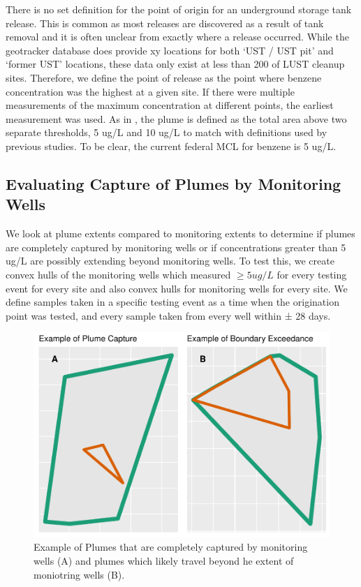 \documentclass[draft,linenumbers]{agujournal2018}
\begin{document}
There is no set definition for the point of origin for an underground
storage tank release. This is common as most releases are discovered as
a result of tank removal and it is often unclear from exactly where a
release occurred. While the geotracker database does provide xy
locations for both `UST / UST pit' and `former UST' locations, these
data only exist at less than 200 of LUST cleanup sites. Therefore, we
define the point of release as the point where benzene concentration was
the highest at a given site. If there were multiple measurements of the
maximum concentration at different points, the earliest measurement was
used. As in \citet{connor2015}, the plume is defined as the total area
above two separate thresholds, 5 ug/L and 10 ug/L to match with
definitions used by previous studies. To be clear, the current federal
MCL for benzene is 5 ug/L.

\subsection{Evaluating Capture of Plumes by Monitoring Wells}

We look at plume extents compared to monitoring extents to determine if
plumes are completely captured by monitoring wells or if concentrations
greater than 5 ug/L are possibly extending beyond monitoring wells. To
test this, we create convex hulls \citep{sf} of the monitoring wells
which measured \(\ge 5 ug/L\) for every testing event for every site and
also convex hulls for monitoring wells for every site. We define samples
taken in a specific testing event as a time when the origination point
was tested, and every sample taken from every well within ± 28 days.

\begin{figure}[h]
\includegraphics{CA_Benzene_Plumes_files/figure-latex/exceedsExample-1} \caption{Example of Plumes that are completely captured by monitoring wells (A) and plumes which likely travel beyond he extent of moniotring wells (B).}\label{fig:exceedsExample}
\end{figure}
\end{document}
